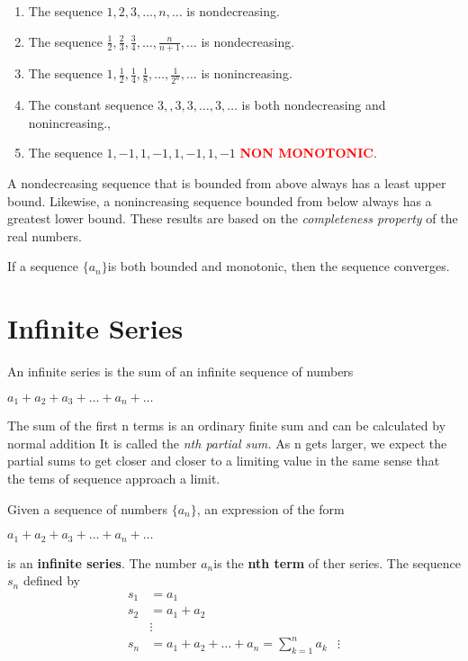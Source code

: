 \documentclass[12pt,a4paper]{article}
\newenvironment{definition}{\begin{definitionbox}}{\end{definitionbox}\vspace{1\baselineskip}}
\newenvironment{theorem}{\begin{theorembox}}{\end{theorembox}\vspace{1\baselineskip}}
\newcommand{\anc}{\(\{a_n\}\)}
\newcommand{\an}{\(a_n\)}
\begin{document}
\begin{example}
    \begin{enumerate}[label=\textbf{\alph*)}]
        \item The sequence \(1, 2, 3, \dots, n, \dots\) is nondecreasing.
        \item The sequence \(\frac{1}{2}, \frac{2}{3}, \frac{3}{4}, \dots, \frac{n}{n+1}, \dots\) is nondecreasing.
        \item The sequence \(1, \frac{1}{2}, \frac{1}{4}, \frac{1}{8}, \dots, \frac{1}{2^n}, \dots\) is nonincreasing.
        \item The constant sequence \(3, ,3 ,3, \dots, 3, \dots \) is both nondecreasing and nonincreasing.,
        \item The sequence \(1, -1, 1, -1, 1, -1, 1, -1\) \textbf{\textcolor{red}{NON MONOTONIC}}.
    \end{enumerate}
\end{example}


A nondecreasing sequence that is bounded from above always has a least upper bound. Likewise, a nonincreasing sequence bounded from below always has a greatest lower bound. These results are based on the \textit{completeness property} of the real numbers.


\begin{theorem}
    If a sequence \anc is both bounded and monotonic, then the sequence converges.
\end{theorem}


\section{Infinite Series}

An infinite series is the sum of an infinite sequence of numbers
\begin{center}
    \(a_1 + a_2 + a_3 + \dots + a_n + \dots\)
\end{center}

The sum of the first n terms is an ordinary finite sum and can be calculated by normal addition It is called the \textit{nth partial sum.}
As n gets larger, we expect the partial sums to get closer and closer to a limiting value in the same sense that the tems of sequence approach a limit.

\begin{definition}

Given a sequence of numbers \anc, an expression of the form
\begin{center}
    \(a_1 + a_2 + a_3 + \dots + a_n + \dots\)
\end{center}
is an \textbf{infinite series}. The number \an is the \textbf{nth term} of ther series. The sequence $s_n$ defined by
\begin{align*}
    s_1 &= a_1 \\
    s_2 &= a_1 + a_2 \\
    &\vdots \\
    s_n &= a_1 + a_2 + \dots + a_n = \sum_{k=1}^{n}a_k
    &\vdots \\
\end{align*}
\end{definition}
\end{document}
